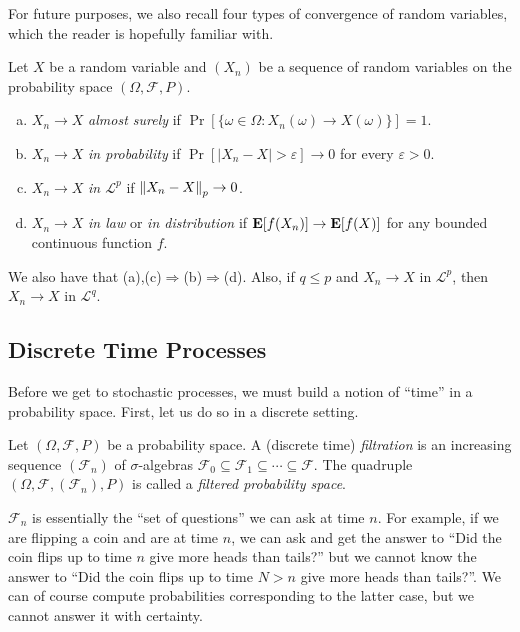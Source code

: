 		For future purposes, we also recall four types of convergence of random variables, which the reader is hopefully familiar with.
		\begin{definition}
			Let $X$ be a random variable and $(X_n)$ be a sequence of random variables on the probability space $(\Omega,\mathcal{F},P)$.
			\begin{enumerate}[(a)]
				\item $X_n\to X$ \textit{almost surely} if $\Pr[\{\omega\in\Omega : X_n(\omega)\to X(\omega)\}]=1$.
				\item $X_n\to X$ \textit{in probability} if $\Pr[|X_n-X|>\varepsilon]\to 0$ for every $\varepsilon>0$.
				\item $X_n\to X$ \textit{in $\mathcal{L}^p$} if $\left\lVert X_n-X\right\rVert_p\to 0$.
				\item $X_n\to X$ \textit{in law} or \textit{in distribution} if $\textbf{E}[f(X_n)]\to\textbf{E}[f(X)]$ for any bounded continuous function $f$. 
		 	\end{enumerate}
		\end{definition}

		We also have that (a),(c)$\Rightarrow$(b)$\Rightarrow$(d). Also, if $q\leq p$ and $X_n\to X$ in $\mathcal{L}^p$, then $X_n\to X$ in $\mathcal{L}^q$.

	\subsection{Discrete Time Processes}

		Before we get to stochastic processes, we must build a notion of ``time'' in a probability space. First, let us do so in a discrete setting.

		\begin{definition}
			Let $(\Omega,\mathcal{F},P)$ be a probability space. A (discrete time) \textit{filtration} is an increasing sequence $(\mathcal{F}_n)$ of $\sigma$-algebras $\mathcal{F}_0\subseteq\mathcal{F}_1\subseteq\cdots\subseteq\mathcal{F}$. The quadruple $(\Omega,\mathcal{F},(\mathcal{F}_n),P)$ is called a \textit{filtered probability space}.
		\end{definition}

		$\mathcal{F}_n$ is essentially the ``set of questions'' we can ask at time $n$. For example, if we are flipping a coin and are at time $n$, we can ask and get the answer to ``Did the coin flips up to time $n$ give more heads than tails?'' but we cannot know the answer to ``Did the coin flips up to time $N>n$ give more heads than tails?''. We can of course compute probabilities corresponding to the latter case, but we cannot answer it with certainty.


